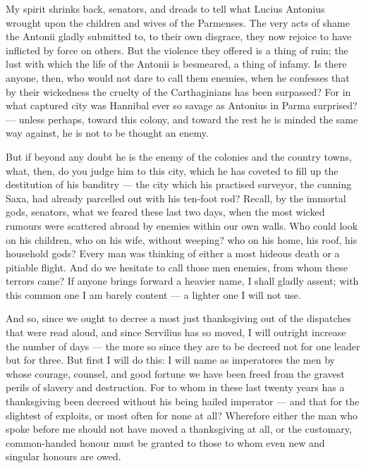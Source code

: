  My spirit shrinks back, senators, and dreads to tell what Lucius Antonius wrought upon the children and wives of the Parmenses. The very acts of shame the Antonii gladly submitted to, to their own disgrace, they now rejoice to have inflicted by force on others. But the violence they offered is a thing of ruin; the lust with which the life of the Antonii is besmeared, a thing of infamy. Is there anyone, then, who would not dare to call them enemies, when he confesses that by their wickedness the cruelty of the Carthaginians has been surpassed? For in what captured city was Hannibal ever so savage as Antonius in Parma surprised? --- unless perhaps, toward this colony, and toward the rest he is minded the same way against, he is not to be thought an enemy.

 But if beyond any doubt he is the enemy of the colonies and the country towns, what, then, do you judge him to this city, which he has coveted to fill up the destitution of his banditry --- the city which his practised surveyor, the cunning Saxa, had already parcelled out with his ten-foot rod? Recall, by the immortal gods, senators, what we feared these last two days, when the most wicked rumours were scattered abroad by enemies within our own walls. Who could look on his children, who on his wife, without weeping? who on his home, his roof, his household gods? Every man was thinking of either a most hideous death or a pitiable flight. And do we hesitate to call those men enemies, from whom these terrors came? If anyone brings forward a heavier name, I shall gladly assent; with this common one I am barely content --- a lighter one I will not use.

 And so, since we ought to decree a most just thanksgiving out of the dispatches that were read aloud, and since Servilius has so moved, I will outright increase the number of days --- the more so since they are to be decreed not for one leader but for three. But first I will do this: I will name as imperatores the men by whose courage, counsel, and good fortune we have been freed from the gravest perils of slavery and destruction. For to whom in these last twenty years has a thanksgiving been decreed without his being hailed imperator --- and that for the slightest of exploits, or most often for none at all? Wherefore either the man who spoke before me should not have moved a thanksgiving at all, or the customary, common-handed honour must be granted to those to whom even new and singular honours are owed.

